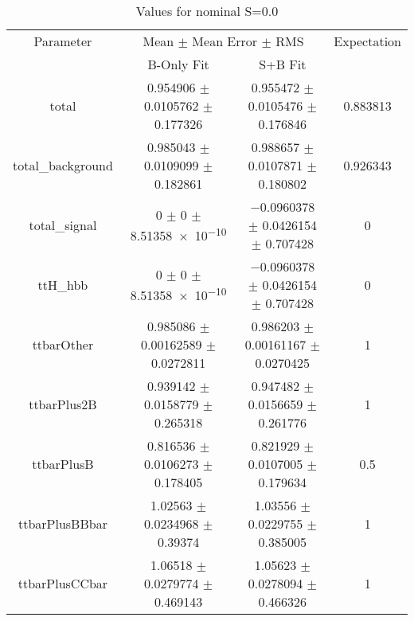 \begin{table}
\centering
\caption{Values for nominal S=0.0}
\begin{tabular}{cccc}
\toprule
Parameter & \multicolumn{2}{c}{Mean $\pm$ Mean Error $\pm$ RMS} & Expectation\\
 & B-Only Fit & S+B Fit & \\
\midrule
total & \num{0.954906} $\pm$ \num{0.0105762} $\pm$ \num{0.177326} & \num{0.955472} $\pm$ \num{0.0105476} $\pm$ \num{0.176846} & \num{0.883813}\\
total\_background & \num{0.985043} $\pm$ \num{0.0109099} $\pm$ \num{0.182861} & \num{0.988657} $\pm$ \num{0.0107871} $\pm$ \num{0.180802} & \num{0.926343}\\
total\_signal & \num{0} $\pm$ \num{0} $\pm$ \num{8.51358e-10} & \num{-0.0960378} $\pm$ \num{0.0426154} $\pm$ \num{0.707428} & \num{0}\\
ttH\_hbb & \num{0} $\pm$ \num{0} $\pm$ \num{8.51358e-10} & \num{-0.0960378} $\pm$ \num{0.0426154} $\pm$ \num{0.707428} & \num{0}\\
ttbarOther & \num{0.985086} $\pm$ \num{0.00162589} $\pm$ \num{0.0272811} & \num{0.986203} $\pm$ \num{0.00161167} $\pm$ \num{0.0270425} & \num{1}\\
ttbarPlus2B & \num{0.939142} $\pm$ \num{0.0158779} $\pm$ \num{0.265318} & \num{0.947482} $\pm$ \num{0.0156659} $\pm$ \num{0.261776} & \num{1}\\
ttbarPlusB & \num{0.816536} $\pm$ \num{0.0106273} $\pm$ \num{0.178405} & \num{0.821929} $\pm$ \num{0.0107005} $\pm$ \num{0.179634} & \num{0.5}\\
ttbarPlusBBbar & \num{1.02563} $\pm$ \num{0.0234968} $\pm$ \num{0.39374} & \num{1.03556} $\pm$ \num{0.0229755} $\pm$ \num{0.385005} & \num{1}\\
ttbarPlusCCbar & \num{1.06518} $\pm$ \num{0.0279774} $\pm$ \num{0.469143} & \num{1.05623} $\pm$ \num{0.0278094} $\pm$ \num{0.466326} & \num{1}\\
\bottomrule
\end{tabular}
\end{table}